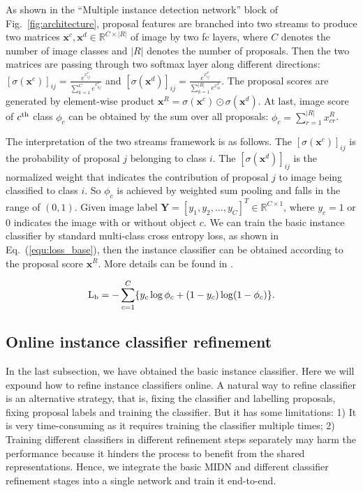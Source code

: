 \documentclass[10pt,twocolumn,letterpaper]{article}
\begin{document}
As shown in the ``Multiple instance detection network'' block of Fig.~\ref{fig:architecture}, proposal features are branched into two streams to produce two matrices $\mathbf{x}^{c}, \mathbf{x}^{d} \in \mathbb{R}^{C \times |R|}$ of image by two fc layers, where $C$ denotes the number of image classes and $|R|$ denotes the number of proposals.
Then the two matrices are passing through two softmax layer along different directions:
$[\sigma(\mathbf{x}^{c})]_{ij} = \frac{e^{x_{ij}^{c}}}{\sum_{k=1}^{C} e^{x_{kj}^{c}}}$ and $[\sigma(\mathbf{x}^{d})]_{ij} = \frac{e^{x_{ij}^{d}}}{\sum_{k=1}^{|R|} e^{x_{ik}^{d}}}$.
The proposal scores are generated by element-wise product $\mathbf{x}^{R} = \sigma(\mathbf{x}^{c}) \odot \sigma(\mathbf{x}^{d})$.
At last, image score of $c^{\textup{th}}$ class $\phi_{c}$ can be obtained by the sum over all proposals: $\phi_{c} = \sum_{r=1}^{|R|} x_{cr}^{R}$.

The interpretation of the two streams framework is as follows.
The $[\sigma(\mathbf{x}^{c})]_{ij}$ is the probability of proposal $j$ belonging to class $i$.
The $[\sigma(\mathbf{x}^{d})]_{ij}$ is the normalized weight that indicates the contribution of proposal $j$ to image being classified to class $i$.
So $\phi_{c}$ is achieved by weighted sum pooling and falls in the range of $(0, 1)$.
Given image label $\mathbf{Y} = [y_{1}, y_{2}, ..., y_{C}]^{T} \in \mathbb{R}^{C\times1}$, where $y_{c} = 1$ or $0$ indicates the image with or without object $c$.
We can train the basic instance classifier by standard multi-class cross entropy loss, as shown in Eq.~(\ref{equ:loss_base}), then the instance classifier can be obtained according to the proposal score $\mathbf{x}^{R}$.
More details can be found in \cite{Ref:Bilen2016}.

\begin{equation}
\label{equ:loss_base}
   \textup{L}_\textup{b} = -\mathop{\sum} \limits_{c=1}^{C} \{y_{c} \log \phi_{c} + (1 - y_{c}) \log (1 - \phi_{c})\}.
\end{equation}


\subsection{Online instance classifier refinement}
\label{sec:oicr}

In the last subsection, we have obtained the basic instance classifier.
Here we will expound how to refine instance classifiers online.
A natural way to refine classifier is an alternative strategy, that is, fixing the classifier and labelling proposals, fixing proposal labels and training the classifier.
But it has some limitations:
1) It is very time-consuming as it requires training the classifier multiple times;
2) Training different classifiers in different refinement steps separately may harm the performance because it hinders the process to benefit from the shared representations.
Hence, we integrate the basic MIDN and different classifier refinement stages into a single network and train it end-to-end.
\end{document}
